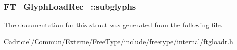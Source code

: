 \hypertarget{struct_f_t___glyph_load_rec___a12ef145fedbeb14cc8b9d320ae3fed96}{
\subsubsection[{subglyphs}]{ F\-T\-\_\-\-Glyph\-Load\-Rec\-\_\-\-::subglyphs}}\label{struct_f_t___glyph_load_rec___a12ef145fedbeb14cc8b9d320ae3fed96}


The documentation for this struct was generated from the following file\-:\begin{DoxyCompactItemize}
\item 
Cadriciel/\-Commun/\-Externe/\-Free\-Type/include/freetype/internal/\hyperlink{ftgloadr_8h}{ftgloadr.\-h}\end{DoxyCompactItemize}
